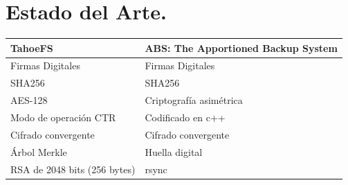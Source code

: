 \section{Estado del Arte. }
\begin{tabular}{ |p{8cm}|p{8cm}| }
\hline
{ \textbf{TahoeFS}}  & {\textbf{ABS: The Apportioned Backup System} } \\
\hline
{Firmas Digitales}  & {Firmas Digitales} \\
\hline
{SHA256}  & {SHA256}  \\
\hline
{AES-128}  & {Criptografía asimétrica}  \\
\hline
{Modo de operación CTR }  & {Codificado en c++} \\
\hline
{Cifrado convergente}  & {Cifrado convergente}  \\
\hline
{Árbol Merkle}  & {Huella digital} \\
\hline
{RSA de 2048 bits (256 bytes) }  & { rsync  } \\
\hline
\end{tabular}
\\
